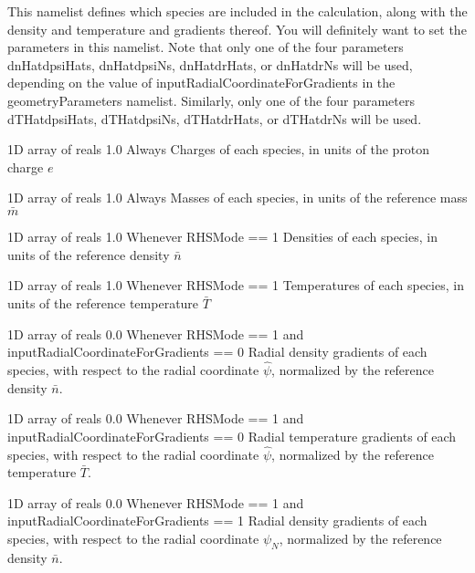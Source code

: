 This namelist defines which species are included in the calculation, along with the density and temperature and gradients thereof.
You will definitely want to set the parameters in this namelist.
Note that only one of the four parameters 
{\ttfamily dnHatdpsiHats}, 
{\ttfamily dnHatdpsiNs}, 
{\ttfamily dnHatdrHats}, or
{\ttfamily dnHatdrNs}
will be used, depending on the value of {\ttfamily inputRadialCoordinateForGradients}
in the {\ttfamily geometryParameters} namelist.
Similarly, only one of the four parameters
{\ttfamily dTHatdpsiHats}, 
{\ttfamily dTHatdpsiNs}, 
{\ttfamily dTHatdrHats}, or
{\ttfamily dTHatdrNs}
will be used.

\myhrule

{1D array of reals}
{1.0}
{Always}
{Charges of each species, in units of the proton charge $e$}

\myhrule

{1D array of reals}
{1.0}
{Always}
{Masses of each species, in units of the reference mass $\bar{m}$}

\myhrule

{1D array of reals}
{1.0}
{Whenever {\ttfamily RHSMode} == 1}
{Densities of each species, in units of the reference density $\bar{n}$}

\myhrule

{1D array of reals}
{1.0}
{Whenever {\ttfamily RHSMode} == 1}
{Temperatures of each species, in units of the reference temperature $\bar{T}$}

\myhrule

{1D array of reals}
{0.0}
{Whenever {\ttfamily RHSMode} == 1 and {\ttfamily inputRadialCoordinateForGradients} == 0}
{Radial density gradients of each species, with respect to the radial coordinate $\hat{\psi}$, normalized by the reference density $\bar{n}$.}

\myhrule

{1D array of reals}
{0.0}
{Whenever {\ttfamily RHSMode} == 1 and {\ttfamily inputRadialCoordinateForGradients} == 0}
{Radial temperature gradients of each species, with respect to the radial coordinate $\hat{\psi}$, normalized by the reference temperature $\bar{T}$.}

\myhrule

{1D array of reals}
{0.0}
{Whenever {\ttfamily RHSMode} == 1 and {\ttfamily inputRadialCoordinateForGradients} == 1}
{Radial density gradients of each species, with respect to the radial coordinate $\psi_N$, normalized by the reference density $\bar{n}$.}

